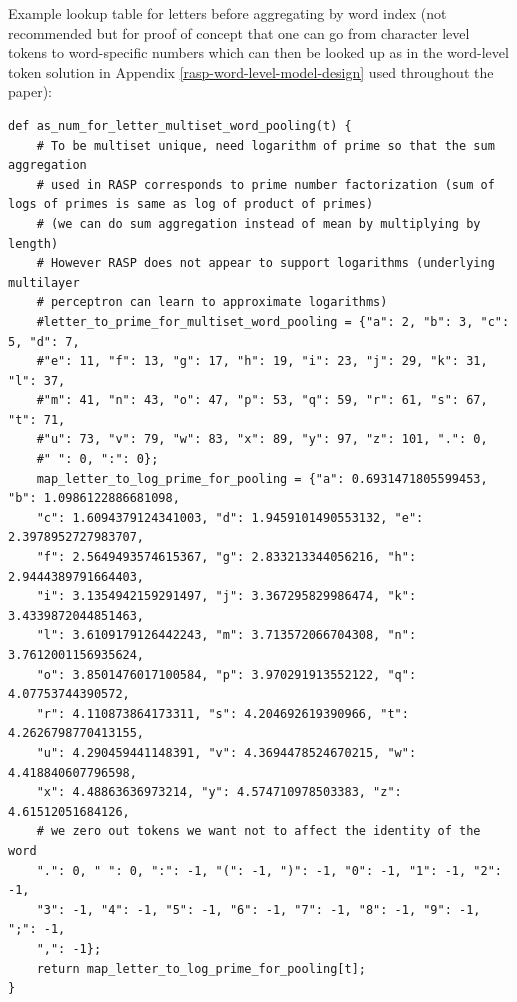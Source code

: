 \documentclass[11pt]{article}
\begin{document}
Example lookup table for letters before aggregating by word index (not recommended but for proof of concept that one can go from character level tokens to word-specific numbers which can then be looked up as in the word-level token solution in Appendix \ref{rasp-word-level-model-design} used throughout the paper):
\clearpage
\begin{tiny}
\begin{verbatim}
def as_num_for_letter_multiset_word_pooling(t) {
    # To be multiset unique, need logarithm of prime so that the sum aggregation
    # used in RASP corresponds to prime number factorization (sum of logs of primes is same as log of product of primes) 
    # (we can do sum aggregation instead of mean by multiplying by length)
    # However RASP does not appear to support logarithms (underlying multilayer 
    # perceptron can learn to approximate logarithms)
    #letter_to_prime_for_multiset_word_pooling = {"a": 2, "b": 3, "c": 5, "d": 7, 
    #"e": 11, "f": 13, "g": 17, "h": 19, "i": 23, "j": 29, "k": 31, "l": 37, 
    #"m": 41, "n": 43, "o": 47, "p": 53, "q": 59, "r": 61, "s": 67, "t": 71, 
    #"u": 73, "v": 79, "w": 83, "x": 89, "y": 97, "z": 101, ".": 0, 
    #" ": 0, ":": 0};
    map_letter_to_log_prime_for_pooling = {"a": 0.6931471805599453, "b": 1.0986122886681098, 
    "c": 1.6094379124341003, "d": 1.9459101490553132, "e": 2.3978952727983707, 
    "f": 2.5649493574615367, "g": 2.833213344056216, "h": 2.9444389791664403, 
    "i": 3.1354942159291497, "j": 3.367295829986474, "k": 3.4339872044851463, 
    "l": 3.6109179126442243, "m": 3.713572066704308, "n": 3.7612001156935624, 
    "o": 3.8501476017100584, "p": 3.970291913552122, "q": 4.07753744390572, 
    "r": 4.110873864173311, "s": 4.204692619390966, "t": 4.2626798770413155, 
    "u": 4.290459441148391, "v": 4.3694478524670215, "w": 4.418840607796598, 
    "x": 4.48863636973214, "y": 4.574710978503383, "z": 4.61512051684126,
    # we zero out tokens we want not to affect the identity of the word
    ".": 0, " ": 0, ":": -1, "(": -1, ")": -1, "0": -1, "1": -1, "2": -1, 
    "3": -1, "4": -1, "5": -1, "6": -1, "7": -1, "8": -1, "9": -1, ";": -1, 
    ",": -1};
    return map_letter_to_log_prime_for_pooling[t];
}
\end{verbatim}
\end{tiny}
\end{document}
